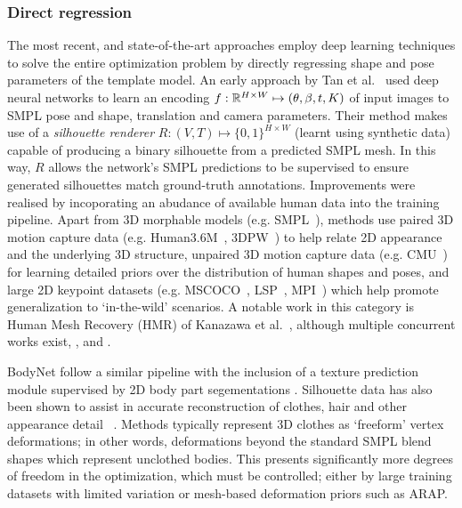     \subsubsection{Direct regression}
    The most recent, and state-of-the-art approaches employ deep learning techniques to solve the entire optimization problem by directly regressing shape and pose parameters of the template model. An early approach by Tan et al.~\cite{tan17indirect} used deep neural networks to learn an encoding $f: {\mathbb{R}^{H \times W}} \mapsto (\theta, \beta, t, K)$ of input images to SMPL pose and shape, translation and camera parameters. Their method makes use of a \emph{silhouette renderer} $R : (V, T) \mapsto \{0,1\}^{H \times W}$ (learnt using synthetic data) capable of producing a binary silhouette from a predicted SMPL mesh. In this way, $R$ allows the network's SMPL predictions to be supervised to ensure generated silhouettes match ground-truth annotations. 
    Improvements were realised by incoporating an abudance of available human data into the training pipeline. Apart from 3D morphable models (e.g. SMPL~\cite{loper15smpl}), methods use paired 3D motion capture data (e.g. Human3.6M~\cite{ionescu2013human3,IonescuSminchisescu11}, 3DPW~\cite{vonmarcard2018recovering}) to help relate 2D appearance and the underlying 3D structure, unpaired 3D motion capture data (e.g. CMU~) for learning detailed priors over the distribution of human shapes and poses, and large 2D keypoint datasets (e.g. MSCOCO~, LSP~, MPI~) which help promote generalization to `in-the-wild' scenarios. A notable work in this category is Human Mesh Recovery (HMR) of Kanazawa et al.~\cite{kanazawa18end-to-end}, although multiple concurrent works exist, ,  and . 

    
    BodyNet  follow a similar pipeline with the inclusion of a texture prediction module supervised by 2D body part segementations . Silhouette data has also been shown to assist in accurate reconstruction of clothes, hair and other appearance detail~\cite{alldieck2019learning}  . Methods typically represent 3D clothes as `freeform' vertex deformations; in other words, deformations beyond the standard SMPL blend shapes which represent unclothed bodies. This presents significantly more degrees of freedom in the optimization, which must be controlled; either by large training datasets with limited variation or mesh-based deformation priors such as ARAP. 

